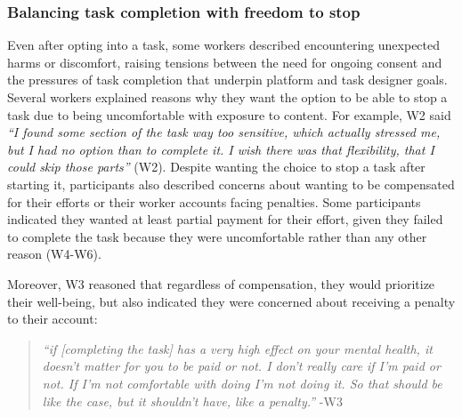 \subsubsection{Balancing task completion with freedom to stop}
Even after opting into a task, some workers described encountering unexpected harms or discomfort, raising tensions between the need for ongoing consent and the pressures of task completion that underpin platform and task designer goals.
Several workers explained reasons why they want the option to be able to stop a task due to being uncomfortable with exposure to content. For example, W2 said \textit{``I found some section of the task way too sensitive, which actually stressed me, but I had no option than to complete it. I wish there was that flexibility, that I could skip those parts''} (W2). Despite wanting the choice to stop a task after starting it, participants also described concerns about wanting to be compensated for their efforts or their worker accounts facing penalties. Some participants indicated they wanted at least partial payment for their effort, given they failed to complete the task because they were uncomfortable rather than any other reason (W4-W6). 

Moreover, W3 reasoned that regardless of compensation, they would prioritize their well-being, but also indicated they were concerned about receiving a penalty to their account:
\begin{quote}
    \textit{``if [completing the task] has a very high effect on your mental health, it doesn't matter for you to be paid or not. I don't really care if I'm paid or not. If I'm not comfortable with doing I'm not doing it. So that should be like the case, but it shouldn't have, like a penalty.''} -W3
\end{quote}

